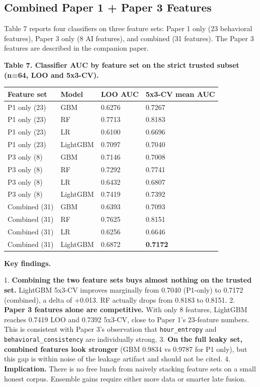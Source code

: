 \documentclass[sigconf,nonacm=false]{acmart}
\begin{document}
\subsection{Combined Paper 1 + Paper 3 Features}

Table 7 reports four classifiers on three feature sets: Paper 1 only (23 behavioral features), Paper 3 only (8 AI features), and combined (31 features). The Paper 3 features are described in the companion paper.

\textbf{Table 7. Classifier AUC by feature set on the strict trusted subset (n=64, LOO and 5x3-CV).}

\begin{table}[h]
\centering
\small
\begin{tabular}{llll}
\toprule
Feature set & Model & LOO AUC & 5x3-CV mean AUC \\
\midrule
P1 only (23) & GBM & 0.6276 & 0.7267 \\
P1 only (23) & RF & 0.7713 & 0.8183 \\
P1 only (23) & LR & 0.6100 & 0.6696 \\
P1 only (23) & LightGBM & 0.7097 & 0.7040 \\
P3 only (8) & GBM & 0.7146 & 0.7008 \\
P3 only (8) & RF & 0.7292 & 0.7741 \\
P3 only (8) & LR & 0.6432 & 0.6807 \\
P3 only (8) & LightGBM & 0.7419 & 0.7392 \\
Combined (31) & GBM & 0.6393 & 0.7093 \\
Combined (31) & RF & 0.7625 & 0.8151 \\
Combined (31) & LR & 0.6256 & 0.6646 \\
Combined (31) & LightGBM & 0.6872 & \textbf{0.7172} \\
\bottomrule
\end{tabular}
\end{table}

\textbf{Key findings.}

1. \textbf{Combining the two feature sets buys almost nothing on the trusted set.} LightGBM 5x3-CV improves marginally from 0.7040 (P1-only) to 0.7172 (combined), a delta of +0.013. RF actually drops from 0.8183 to 0.8151.
2. \textbf{Paper 3 features alone are competitive.} With only 8 features, LightGBM reaches 0.7419 LOO and 0.7392 5x3-CV, close to Paper 1's 23-feature numbers. This is consistent with Paper 3's observation that \texttt{hour\_entropy} and \texttt{behavioral\_consistency} are individually strong.
3. \textbf{On the full leaky set, combined features look stronger} (GBM 0.9834 vs 0.9787 for P1 only), but this gap is within noise of the leakage artifact and should not be cited.
4. \textbf{Implication.} There is no free lunch from naively stacking feature sets on a small honest corpus. Ensemble gains require either more data or smarter late fusion.
\end{document}

